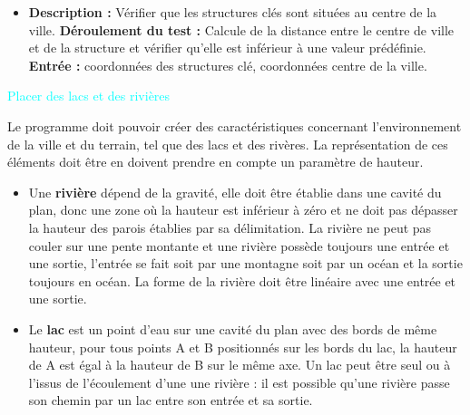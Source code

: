 {}
{

\begin{itemize}
   
 \item \textbf{\tab Description : } Vérifier que les structures clés sont situées au centre de la ville.\newline
\textbf{\tab Déroulement du test : } Calcule de la distance entre le centre de ville et de la structure et vérifier qu’elle est inférieur à une valeur prédéfinie.\newline
\textbf{\tab Entrée : } coordonnées des structures clé, coordonnées centre de la ville.
\end{itemize}

}
\besoin{}
{\textcolor{cyan}{Placer des lacs et des rivières}}
{
Le programme doit pouvoir créer des caractéristiques concernant l'environnement de la ville et du terrain, tel que des lacs et des rivères. La représentation de ces éléments doit être en doivent prendre en compte un paramètre de hauteur. 
\begin{itemize}
	\item Une \textbf{rivière} dépend de la gravité, elle doit être établie dans une cavité du plan, donc une zone où la hauteur est inférieur à zéro et ne doit pas dépasser la hauteur des parois établies par sa délimitation. 
	La rivière ne peut pas couler sur une pente montante et une rivière possède toujours une entrée et une sortie, l’entrée se fait soit par une montagne soit par un océan et la sortie toujours en océan.
	La forme de la rivière doit être linéaire avec une entrée et une sortie.
	\item Le \textbf{lac} est un point d'eau sur une cavité du plan avec des bords de même hauteur, pour tous points A et B positionnés sur les bords du lac, la hauteur de A est égal à la hauteur de B sur le même axe. 
	Un lac peut être seul ou à l'issus de l'écoulement d'une une rivière : il est possible qu’une rivière passe son chemin par un lac entre son entrée et sa sortie.
\end{itemize}
}
{}
